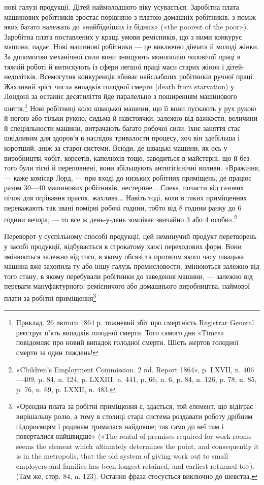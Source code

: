 \parcont{}  %
нові галузі продукції. Дітей наймолодшого віку усувається. Заробітна
плата машинових робітників зростає порівняно з платою
домашніх робітників, з-поміж яких багато належать до
«найбідніших із бідних» («the poorest of the poor»). Заробітна плата
поставлених у кращі умови ремісників, що з ними конкурує
машина, падає. Нові машинові робітники — це виключно дівчата
й молоді жінки. За допомогою механічної сили вони знищують
монополію чоловічої праці в тяжчій роботі й витискують із сфери
легшої праці маси старих жінок і дітей-недолітків. Всемогутня
конкуренція вбиває найслабших робітників ручної праці. Жахливий
зріст числа випадків голодної смерти (death from starvation)
у Лондоні за останнє десятиліття йде паралельно з поширенням
машинового шиття.\footnote{
Приклад. 26 лютого 1864 р. тижневий збіт про смертність Registrar
General реєструє п’ять випадків голодної смерти. Того самого
дня «Times» повідомляє про новий випадок голодної смерти. Шість жертов
голодної смерти за один тиждень!
} Нові робітниці коло швацької машини,
що її вони пускають у рух рукою й ногою або тільки рукою,
сидьма й навстоячки, залежно від важкости, величини й спеціяльности
машини, витрачають багато робочої сили. їхнє заняття стає
шкідливим для здоров’я в наслідок тривалости процесу, хоч він
здебільша і коротший, аніж за старої системи. Всюди, де швацькі
машини, як ось у виробництві чобіт, корсетів, капелюхів тощо,
заводиться в майстерні, що й без того були тісні й переповнені,
вони збільшують антигігієнічні впливи. «Вражіння, — каже комісар
Лорд, — при вході до низьких робітних приміщень, де працює
разом 30—40 машинових робітників, нестерпне... Спека, почасти
від газових пічок для огрівання прасок, жахлива... Навіть тоді,
коли в таких приміщеннях переважають так звані помірні робочі
години, тобто від 8 години ранку до 6 години вечора, — то все ж
день-у-день зомліває звичайно 3 або 4 особи».\footnote{
«Children’s Employment Commission. 2 nd. Report 1864», p. LXVII,
n. 406—409, p. 84, n. 124, p. LXXIII, n. 441, p. 66, n. 6, p. 84, n. 126,
p. 78, n. 85, p. 76, n. 69, p. LXXII, n. 483.
}

Переворот у суспільному способі продукції, цей неминучий
продукт перетворень у засобі продукції, відбувається в строкатому
хаосі переходових форм. Вони змінюються залежно від того,
в якому обсязі та протягом якого часу швацька машина вже захопила
ту або іншу галузь промисловости, змінюються залежно
від того стану, в якому перебували робітники до заведення
машини, — залежно від переваги мануфактурного, ремісничого або
домашнього виробництва, наймової плати за робітні приміщення\footnote{
«Орендна плата за робітні приміщення є, здається, той елемент,
що відіграє вирішальну ролю, а тому в столиці стара система роздавати
роботу дрібним підприємцям і родинам трималася найдовше; так само
до неї там і поверталися найшвидше» («The rental of premises required
for work rooms seems the element which ultimately determines the point,
and consequently it is in the metropolis, that the old system of giving work
out to small employers and families has been longest retained, and earliest
returned to»). (Там же, стор. 84, n. 123). Остання фраза стосується виключно
до шевства.
}
\parbreak{}  %
